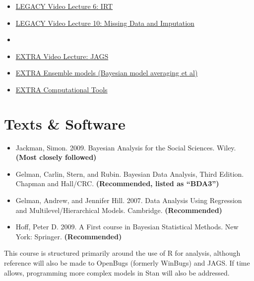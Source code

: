 \documentclass[11pt, leqno, fleqn]{article}
\begin{document}
\begin{itemize}
\item[] \href{http://youtu.be/dfPq_WTFzQ0}{LEGACY Video Lecture 6: IRT} \\
\item[] \href{http://youtu.be/qfpZcsb32Z4}{LEGACY Video Lecture 10: Missing Data and Imputation} \\
\item[]
\item[] \href{http://youtu.be/-89nkSHsFV4}{EXTRA Video Lecture: JAGS} \\
\item[] \href{https://www.youtube.com/watch?v=jAVHB3D04EY}{EXTRA Ensemble models (Bayesian model averaging et al)}\\
\item[] \href{https://www.youtube.com/watch?v=kcBcYev8oaU&index=6&list=PLAFC5F02F224FA59F}{EXTRA Computational Tools}\\
\end{itemize}

\section*{Texts \& Software}
\begin{itemize}
\item[] Jackman, Simon. 2009. Bayesian Analysis for the Social Sciences. Wiley. {\bf(Most closely followed)}
\item[] Gelman, Carlin, Stern, and Rubin. Bayesian Data Analysis, Third Edition. Chapman and Hall/CRC. {\bf(Recommended, listed as ``BDA3'')}
\item[] Gelman, Andrew, and Jennifer Hill. 2007. Data Analysis Using Regression and Multilevel/Hierarchical Models. Cambridge. {\bf(Recommended)}
\item[] Hoff, Peter D. 2009. A First course in Bayesian Statistical Methods. New York: Springer. {\bf (Recommended)}
\end{itemize}
This course is structured primarily around the use of \textsf{R} for analysis, although reference will also be made to OpenBugs (formerly WinBugs) and JAGS. If time allows, programming more complex models in Stan will also be addressed.\\
\end{document}
